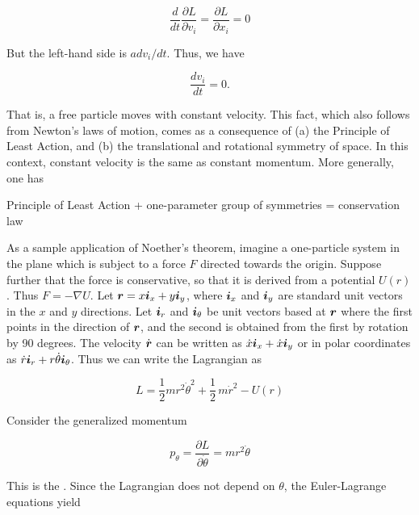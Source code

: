 \begin{equation}
\frac{d}{dt} \frac{\partial L}{\partial v_i} = \frac{\partial L}{\partial x_i} = 0
\end{equation}

But the left-hand side is $a dv_i/dt$.  Thus, we have

\begin{equation}
\frac{dv_i}{dt} = 0.
\end{equation}

That is, a free particle moves with constant velocity. This fact, which also follows from Newton's laws of motion, comes as a consequence of (a) the Principle of Least Action, and (b) the translational and rotational symmetry of space.  In this context, constant velocity is the same as constant momentum.  More generally, one has

\begin{theorem} 
Principle of Least Action + one-parameter group of symmetries = conservation law
\end{theorem}

As a sample application of Noether's theorem, imagine a one-particle system in the plane which is subject to a force $F$ directed towards the origin. Suppose further that the force is conservative, so that it is derived from a potential $U(r)$.  Thus $F = - \nabla U$.  Let $\boldsymbol{r} = x\boldsymbol{i}_x + y\boldsymbol{i}_y$, where $\boldsymbol{i}_x$ and $\boldsymbol{i}_y$ are standard unit vectors in the $x$ and $y$ directions. Let $\boldsymbol{i}_r$ and $\boldsymbol{i}_\theta$ be unit vectors based at $\boldsymbol{r}$ where the first points in the direction of $\boldsymbol{r}$,  and the second is obtained from the first by rotation by 90 degrees.  The velocity $\dot {\boldsymbol{r}}$ can be written as $\dot x \boldsymbol{i}_x + \dot x \boldsymbol{i}_y$ or in polar coordinates as $\dot r \boldsymbol{i}_r + r\dot \theta \boldsymbol{i}_\theta$.  Thus we can write the Lagrangian as

\begin{equation}
L
  = \frac{1}{2} mr^2 \dot \theta^2
  + \frac{1}{2}\, m\dot r^2
  - U(r)
\end{equation}

Consider the generalized momentum

\begin{equation}
p_\theta = \frac{\partial L}{\partial \dot \theta} = mr^2\dot\theta
\end{equation}

This is the .
Since the Lagrangian does not depend on $\theta$, the Euler-Lagrange equations yield

